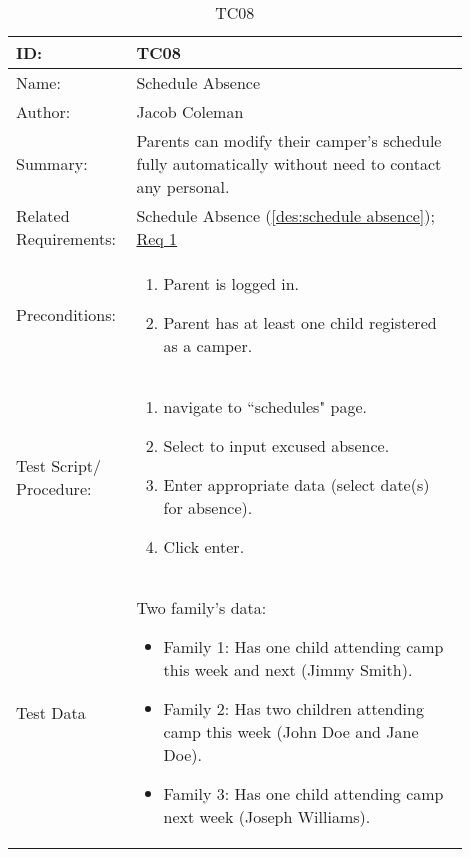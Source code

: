 \documentclass[11pt]{article}
\begin{document}
\begin{table}[H]
\begin{center}
\caption{TC08}
\label{TC08}
\begin{tabular}{p{0.20\linewidth}p{0.70\linewidth}}
	ID: & TC08\\\hline
	Name: & Schedule Absence \\\hline
	Author: & Jacob Coleman\\\hline
	Summary: & Parents can modify their camper's schedule fully automatically without need to contact any personal. \\\hline
	Related \hspace{5em} Requirements:& Schedule Absence (\cref{des:schedule absence}); \hyperlink{Req1}{Req 1}\\\hline
	Preconditions:& \begin{enumerate}[topsep=0pt] 
		\item Parent is logged in.
		\item Parent has at least one child registered as a camper.
	\end{enumerate}\\\hline
	Test Script/ Procedure: & \begin{enumerate}[topsep=0pt]
	\item navigate to ``schedules" page.
	\item Select to input excused absence.
	\item Enter appropriate data (select date(s) for absence).
	\item Click enter.
	\end{enumerate}\\\hline
	Test Data & \vspace*{.25em} Two family's data:
	\begin{itemize}[topsep=0pt]
		\item Family 1: Has one child attending camp this week and next (Jimmy Smith).
		\item Family 2: Has two children attending camp this week (John Doe and Jane Doe).
		\item Family 3: Has one child attending camp next week (Joseph Williams).
	\end{itemize}
\end{tabular}
\end{center}
\end{table}
\end{document}

